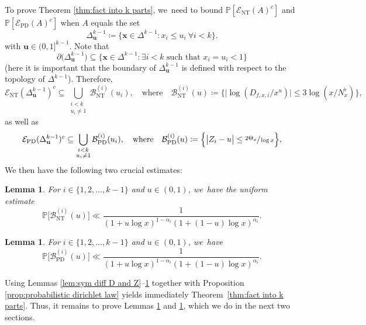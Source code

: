\documentclass[11pt]{article}
\newcommand{\bu}{{\boldsymbol u}}
\newcommand{\bx}{{\boldsymbol x}}
\newcommand{\PP}{\mathbb{P}}
\newcommand{\EC}{\mathcal{E}}
\newcommand{\simplex}{\Delta^{k-1}}
\newcommand{\bg}{\big}
\newcommand{\bgg}{\Big}
\newcommand{\ECnt}{\EC_{\mathrm{NT}}}
\newcommand{\ECprob}{\EC_{\mathrm{PD}}}
\newcommand{\Bnt}{\mathcal{B}_{\mathrm{NT}}}
\newcommand{\Bprob}{\mathcal{B}_{\mathrm{PD}}}
\theoremstyle{plain}
\newtheorem{lem}[cor]{Lemma}
\theoremstyle{definition}
\begin{document}
To prove Theorem \ref{thm:fact into k parts}, we~need to bound $\PP[\ECnt(A)^c]$ and $\PP[\ECprob(A)^c]$ when $A$ equals the set
\[
\simplex_{\mathbf{u}} \coloneqq \{\bx\in \simplex: x_i\le u_i\ \forall i<k\}.
\]
with $\bu\in(0,1]^{k-1}$. Note that
\[
\partial \bg(\simplex_{\mathbf{u}}\bg) \subseteq \{\bx \in \simplex : \exists i < k \text{ such that } x_i = u_i < 1\}
\]
(here it is important that the boundary of $\simplex_{\mathbf{u}}$ is defined with respect to the topology of $\simplex$). Therefore,
\[
\ECnt(\simplex_{\mathbf{u}})^c\subseteq\! \bigcup_{\substack{i<k \\ u_i\neq 1}} \Bnt^{(i)}(u_i),
\quad\text{where}\quad
\Bnt^{(i)}(u) \coloneqq \bgg\{ \bg| \log(D_{f,x,i}/x^u)\bg|\le 3\log(x/N_x^\flat) \bgg\},
\]
as well as
\[
\ECprob(\simplex_{\mathbf{u}})^c\subseteq \bigcup_{\substack{i< k \\ u_i\neq 1}} \Bprob^{(i)}(u_i),
\quad\text{where}\quad
\Bprob^{(i)}(u) \coloneqq \bgg\{ \bg| Z_i - u \bg|\le \sfrac{2\Theta_x}{\log x} \bgg\},
\]
We then have the following two crucial estimates:

\begin{lem}
\label{lem:bound of prob of ECnt}
For $i\in\{1,2,\dots,k-1\}$ and $u\in(0,1)$, we~have the uniform estimate
\[
\PP\bg[\Bnt^{(i)}(u) \bg] \ll \frac{1}{(1+ u\log x)^{1-\alpha_i}(1+(1-u)\log x)^{\alpha_i}}.
\]
\end{lem}

\begin{lem}
\label{lem:bound of prob of ECprob}
For $i\in\{1,2,\dots,k-1\}$ and $u\in(0,1)$, we~have
\[
\PP\bg[\Bprob^{(i)}(u) \bg] \ll \frac{1}{(1+ u\log x)^{1-\alpha_i}(1+(1-u)\log x)^{\alpha_i}}.
\]
\end{lem}

Using Lemmas \ref{lem:sym diff D and Z}--\ref{lem:bound of prob of ECprob} together with Proposition \ref{prop:probabilistic dirichlet law} yields immediately Theorem~\ref{thm:fact into k parts}. Thus, it remains to prove Lemmas \ref{lem:bound of prob of ECnt} and \ref{lem:bound of prob of ECprob}, which we do in the next two sections.
\end{document}

